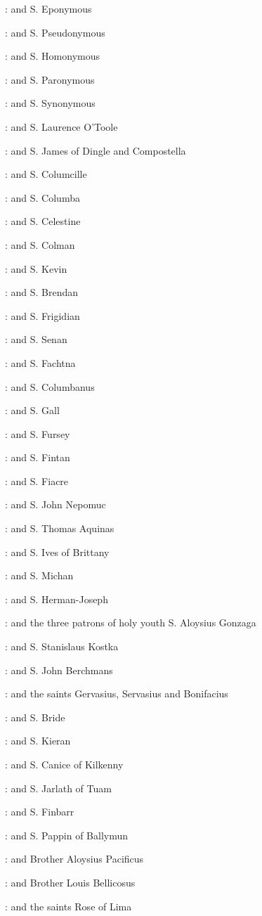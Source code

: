 :
and S. Eponymous 

:
and S. Pseudonymous 

:
and S. Homonymous 

:
and S. Paronymous 

:
and S. Synonymous 

:
and S. Laurence O'Toole 

:
and S. James of Dingle and Compostella 

:
and S. Columcille 

:
and S. Columba 

:
and S. Celestine 

:
and S. Colman 

:
and S. Kevin 

:
and S. Brendan 

:
and S. Frigidian 

:
and S. Senan 

:
and S. Fachtna 

:
and S. Columbanus 

:
and S. Gall 

:
and S. Fursey 

:
and S. Fintan 

:
and S. Fiacre 

:
and S. John Nepomuc 

:
and S. Thomas Aquinas 

:
and S. Ives of Brittany 

:
and S. Michan 

:
and S. Herman-Joseph 

:
and the three patrons of holy youth S. Aloysius Gonzaga 

:
and S. Stanislaus Kostka 

:
and S. John Berchmans 

:
and the saints Gervasius, Servasius and Bonifacius 

:
and S. Bride 

:
and S. Kieran 

:
and S. Canice of Kilkenny 

:
and S. Jarlath of Tuam 

:
and S. Finbarr 

:
and S. Pappin of Ballymun 

:
and Brother Aloysius Pacificus 

:
and Brother Louis Bellicosus 

:
and the saints Rose of Lima 

